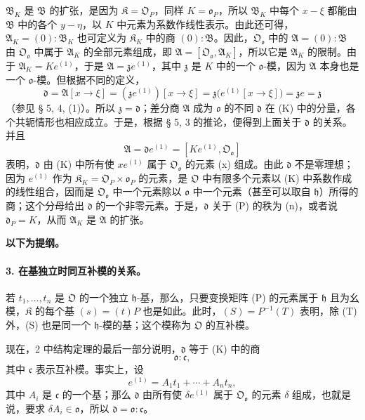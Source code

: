 \(\mathfrak B_K\) 是 \(\mathfrak B\) 的扩张，是因为 \(\mathfrak K=\mathfrak O_P\)，同样 \(K=\mathfrak o_P\)，所以 \(\mathfrak B_K\) 中每个 \(x-\xi\) 都能由 \(\mathfrak B\) 中的各个 \(y-\eta\)，以 \(K\) 中元素为系数作线性表示。由此还可得，\(\mathfrak A_K=(0):\mathfrak B_K\) 也可定义为 \(\mathfrak K_K\) 中的商 \((0):\mathfrak B\)。因此，\(\mathfrak O_{\mathfrak o}\) 中的 \(\mathfrak A=(0):\mathfrak B\) 由 \(\mathfrak O_{\mathfrak o}\) 中属于 \(\mathfrak A_K\) 的全部元素组成，即 \(\mathfrak A=[\mathfrak O_{\mathfrak o},\mathfrak A_K]\)，所以它是 \(\mathfrak A_K\) 的限制。由于 \(\mathfrak A_K=Ke^{(1)}\)，于是 \(\mathfrak A=\mathfrak z e^{(1)}\)，其中 \(\mathfrak z\) 是 \(K\) 中的一个 \(\mathfrak o\)-模，因为 \(\mathfrak A\) 本身也是一个 \(\mathfrak o\)-模。但根据不同的定义，
\[
\mathfrak d=\mathfrak A[x\to\xi]
=(\mathfrak z e^{(1)})[x\to\xi]
=\mathfrak z\bigl(e^{(1)}[x\to\xi]\bigr)=\mathfrak z e=\mathfrak z
\]
（参见 § 5, 4, (1)）。所以 \(\mathfrak z=\mathfrak d\)；差分商 \(\mathfrak A\) 成为 \(\mathfrak o\) 的不同 \(\mathfrak d\) 在 (K) 中的分量，各个共轭情形也相应成立。于是，根据 § 5, 3 的推论，便得到上面关于 \(\mathfrak d\) 的关系。并且
\[
\mathfrak A=\mathfrak d e^{(1)}=[Ke^{(1)},\mathfrak O_{\mathfrak o}]
\]
表明，\(\mathfrak d\) 由 (K) 中所有使 \(xe^{(1)}\) 属于 \(\mathfrak O_{\mathfrak o}\) 的元素 (x) 组成。由此 \(\mathfrak d\) 不是零理想；因为 \(e^{(1)}\) 作为 \(\mathfrak K_K=\mathfrak O_P\times\mathfrak o_P\) 的元素，是 \(\mathfrak O\) 中有限多个元素以 (K) 中系数作成的线性组合，因而是 \(\mathfrak O_{\mathfrak o}\) 中一个元素除以 \(\mathfrak o\) 中一个元素（甚至可以取自 \(\mathfrak h\)）所得的商；这个分母给出 \(\mathfrak d\) 的一个非零元素。于是，\(\mathfrak d\) 关于 (P) 的秩为 (n)，或者说 \(\mathfrak d_P=K\)，从而 \(\mathfrak A_K\) 是 \(\mathfrak A\) 的扩张。

\begin{center}
\textbf{以下为提纲。}
\end{center}

\paragraph{3. 在基独立时同互补模的关系。}
若 \(t_1,\ldots,t_n\) 是 \(\mathfrak O\) 的一个独立 \(\mathfrak h\)-基，那么，只要变换矩阵 (P) 的元素属于 \(\mathfrak h\) 且为幺模，\(\mathfrak K\) 的每个基 \((s)=(t)P\) 也是如此。此时，\((S)=P^{-1}(T)\) 表明，除 (T) 外，(S) 也是同一个 \(\mathfrak h\)-模的基；这个模称为 \(\mathfrak O\) 的互补模。

现在，2 中结构定理的最后一部分说明，\(\mathfrak d\) 等于 (K) 中的商
\[
\mathfrak o:\mathfrak c,
\]
其中 \(\mathfrak c\) 表示互补模。事实上，设
\[
e^{(1)}=A_1t_1+\cdots+A_nt_n,
\]
其中 \(A_i\) 是 \(\mathfrak c\) 的一个基；那么 \(\mathfrak d\) 由所有使 \(\delta e^{(1)}\) 属于 \(\mathfrak O_{\mathfrak o}\) 的元素 \(\delta\) 组成，也就是说，要求 \(\delta A_i\in\mathfrak o\)，所以 \(\mathfrak d=\mathfrak o:\mathfrak c\)。

